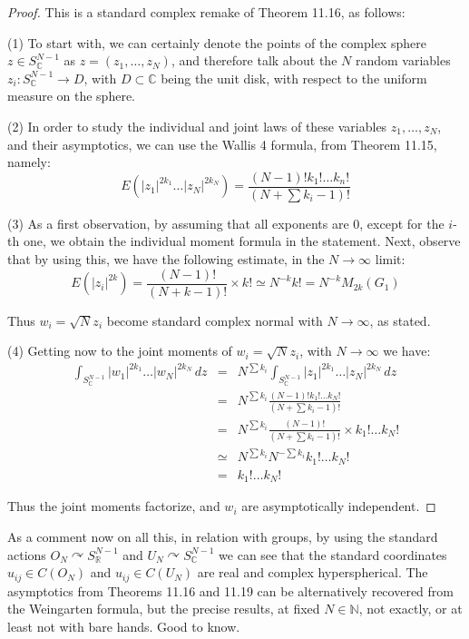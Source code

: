 \documentclass[12pt]{amsbook}
\begin{document}
\begin{proof}
This is a standard complex remake of Theorem 11.16, as follows:

\medskip

(1) To start with, we can certainly denote the points of the complex sphere $z\in S^{N-1}_\mathbb C$ as $z=(z_1,\ldots,z_N)$, and therefore talk about the $N$ random variables $z_i:S^{N-1}_\mathbb C\to D$, with $D\subset\mathbb C$ being the unit disk, with respect to the uniform measure on the sphere.

\medskip

(2) In order to study the individual and joint laws of these variables $z_1,\ldots,z_N$, and their asymptotics, we can use the Wallis 4 formula, from Theorem 11.15, namely:
$$E\left(|z_1|^{2k_1}\ldots|z_N|^{2k_N}\right)=\frac{(N-1)!k_1!\ldots k_n!}{(N+\sum k_i-1)!}$$

(3) As a first observation, by assuming that all exponents are 0, except for the $i$-th one, we obtain the individual moment formula in the statement. Next, observe that by using this, we have the following estimate, in the $N\to\infty$ limit:
$$E(|z_i|^{2k})
=\frac{(N-1)!}{(N+k-1)!}\times k!
\simeq N^{-k}k!
=N^{-k}M_{2k}(G_1)$$

Thus $w_i=\sqrt{N}z_i$ become standard complex normal with $N\to\infty$, as stated.

\medskip

(4) Getting now to the joint moments of $w_i=\sqrt{N}z_i$, with $N\to\infty$ we have:
\begin{eqnarray*}
\int_{S^{N-1}_\mathbb C}|w_1|^{2k_1}\ldots |w_N|^{2k_N}\,dz
&=&N^{\sum k_i}\int_{S^{N-1}_\mathbb C}|z_1|^{2k_1}\ldots|z_N|^{2k_N}\,dz\\
&=&N^{\sum k_i}\frac{(N-1)!k_1!\ldots k_N!}{(N+\sum k_i-1)!}\\
&=&N^{\sum k_i}\frac{(N-1)!}{(N+\sum k_i-1)!}\times k_1!\ldots k_N!\\
&\simeq&N^{\sum k_i}N^{-\sum k_i}k_1!\ldots k_N!\\
&=&k_1!\ldots k_N!
\end{eqnarray*}

Thus the joint moments factorize, and $w_i$ are asymptotically independent.
\end{proof}

As a comment now on all this, in relation with groups, by using the standard actions $O_N\curvearrowright S^{N-1}_\mathbb R$ and $U_N\curvearrowright S^{N-1}_\mathbb C$ we can see that the standard coordinates $u_{ij}\in C(O_N)$ and $u_{ij}\in C(U_N)$ are real and complex hyperspherical. The asymptotics from Theorems 11.16 and 11.19 can be alternatively recovered from the Weingarten formula, but the precise results, at fixed $N\in\mathbb N$, not exactly, or at least not with bare hands. Good to know.
\end{document}
